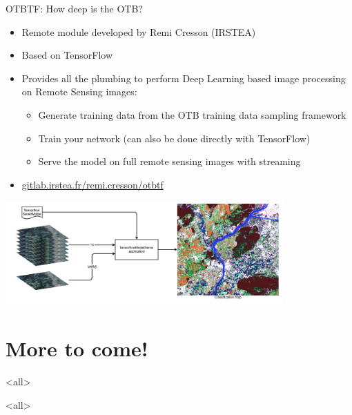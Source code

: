 \documentclass[8pt]{beamer}
\begin{document}
\begin{frame}{OTBTF: How deep is the OTB?}
  \begin{itemize}
  \item Remote  module developed by Remi Cresson (IRSTEA)
  \item Based on TensorFlow
  \item Provides all the plumbing to perform Deep Learning based image processing on Remote Sensing images:
    \begin{itemize}
      \item Generate training data from the OTB training data sampling framework
      \item Train your network (can also be done directly with TensorFlow)
      \item Serve the model on full remote sensing images with streaming
    \end{itemize}
    \item \url{gitlab.irstea.fr/remi.cresson/otbtf}
  \end{itemize}
\begin{center}
  \includegraphics[width=0.8\textwidth]{images/classif_map.png}
\end{center}
\end{frame}

\section{More to come!}
\mode<all>


\mode<all>

\end{document}
